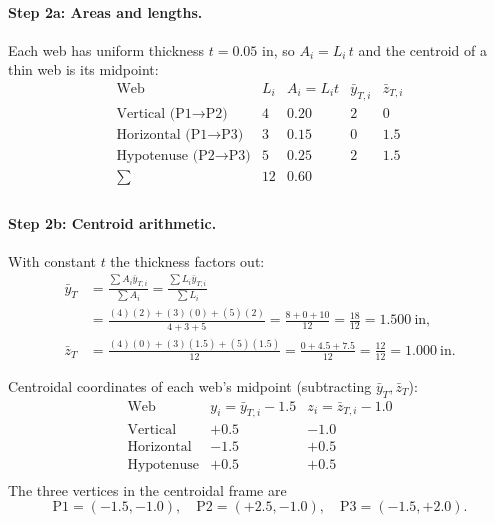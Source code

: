 \documentclass[11pt]{article}
\begin{document}
\paragraph{Step 2a: Areas and lengths.} Each web has uniform thickness $t = 0.05$ in, so $A_i = L_i\,t$ and the centroid of a thin web is its midpoint:
\[
\begin{array}{lcccc}
\text{Web} & L_i & A_i = L_i t & \bar y_{T,i} & \bar z_{T,i} \\
\hline
\text{Vertical (P1$\to$P2)} & 4 & 0.20 & 2 & 0 \\
\text{Horizontal (P1$\to$P3)} & 3 & 0.15 & 0 & 1.5 \\
\text{Hypotenuse (P2$\to$P3)} & 5 & 0.25 & 2 & 1.5 \\
\hline
\sum & 12 & 0.60 & & \\
\end{array}
\]

\paragraph{Step 2b: Centroid arithmetic.} With constant $t$ the thickness factors out:
\begin{align*}
\bar y_T &= \frac{\sum A_i \bar y_{T,i}}{\sum A_i} = \frac{\sum L_i \bar y_{T,i}}{\sum L_i}\\
&= \frac{(4)(2) + (3)(0) + (5)(2)}{4 + 3 + 5} = \frac{8 + 0 + 10}{12} = \frac{18}{12} = 1.500\ \text{in},\\
\bar z_T &= \frac{(4)(0) + (3)(1.5) + (5)(1.5)}{12} = \frac{0 + 4.5 + 7.5}{12} = \frac{12}{12} = 1.000\ \text{in}.
\end{align*}

Centroidal coordinates of each web's midpoint (subtracting $\bar y_T,\bar z_T$):
\[
\begin{array}{lcc}
\text{Web} & y_i = \bar y_{T,i} - 1.5 & z_i = \bar z_{T,i} - 1.0 \\
\hline
\text{Vertical} & +0.5 & -1.0 \\
\text{Horizontal} & -1.5 & +0.5 \\
\text{Hypotenuse} & +0.5 & +0.5 \\
\end{array}
\]
The three vertices in the centroidal frame are
\[
\text{P1}=(-1.5,-1.0),\quad \text{P2}=(+2.5,-1.0),\quad \text{P3}=(-1.5,+2.0).
\]
\end{document}
